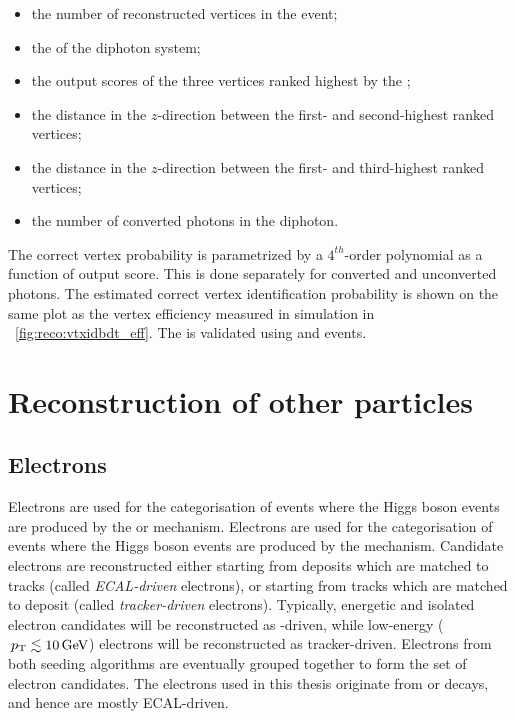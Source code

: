 \begin{itemize}
\item the number of reconstructed vertices in the event;
\item the \pT of the diphoton system;
\item the output scores of the three vertices ranked highest by the \VtxIdBdt;
\item the distance in the $z$-direction between the first- and second-highest ranked vertices;
\item the distance in the $z$-direction between the first- and third-highest ranked vertices;
\item the number of converted photons in the diphoton. 
\end{itemize}

The correct vertex probability is parametrized by a $4^{th}$-order polynomial as a function of \VtxIdBdt output score. This is done separately for converted and unconverted photons. The estimated correct vertex identification probability is shown on the same plot as the vertex efficiency measured in simulation in \Fig~\ref{fig:reco:vtxidbdt_eff}. The \VtxProbBdt is validated using \Zmumu and \gammaJet events. 

\section{Reconstruction of other particles} 
\label{reco:sec:other}
\subsection{Electrons}

\ifNewAnalysis
Electrons are used for the categorisation of \Hgg events where the Higgs boson events are produced by the \ZH or \WH mechanism. 
\else
Electrons are used for the categorisation of \Hgg events where the Higgs boson events are produced by the \ttH mechanism. 
\fi
Candidate \PF electrons are reconstructed either starting from \ECAL deposits which are matched to tracks (called \emph{ECAL-driven} electrons), or starting from tracks which are matched to \ECAL deposit (called \emph{tracker-driven} electrons). Typically, energetic and isolated electron candidates will be reconstructed as \ECAL-driven, while low-energy ($\,p_\text{T} \lesssim 10\,\text{Ge\hspace{-.08em}V}$) electrons will be reconstructed as tracker-driven. Electrons from both seeding algorithms are eventually grouped together to form the set of \PF electron candidates. The electrons used in this thesis originate from \PWpm or \PZ decays, and hence are mostly ECAL-driven.

